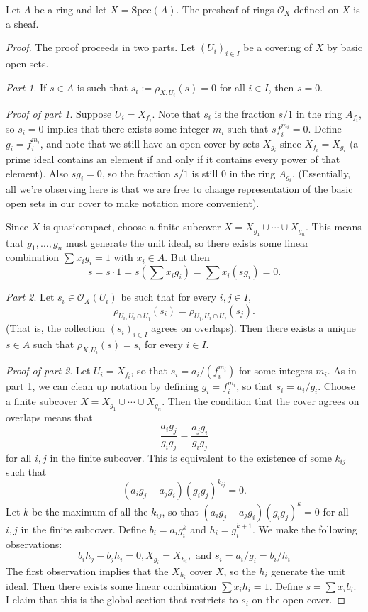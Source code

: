 \begin{proposition}
Let $ A$ be a ring and let $ X = \mathrm{Spec}(A)$. The presheaf
of rings $ \mathcal{O}_X$ defined on $ X$ is a sheaf.
\end{proposition}

\begin{proof}
The proof proceeds in two parts. Let $ (U_i)_{i \in I}$ be a
covering of $ X$ by basic open sets.

\emph{Part 1}. If $ s \in A$ is such that $ s_i := \rho_{X,
U_i}(s) = 0$ for all $ i \in I$, then $ s = 0$.

\emph{Proof of part 1}. Suppose $ U_i = X_{f_i}$. Note that $
s_i$ is the fraction $ s/1$ in the ring $ A_{f_i}$, so $ s_i =
0$ implies that there exists some integer $ m_i$ such that $
sf_i^{m_i} = 0$. Define $ g_i = f_i ^{m_i}$, and note that we
still have an open cover by sets $ X_{g_i}$ since $ X_{f_i} =
X_{g_i}$ (a prime ideal contains an element if and only if it
contains every power of that element). Also $ s g_i = 0$, so the
fraction $ s/1$ is still $ 0$ in the ring $ A_{g_i}$.
(Essentially, all we're observing here is that we are free to
change representation of the basic open sets in our cover to
make notation more convenient).

Since $ X$ is quasicompact, choose a finite subcover $ X =
X_{g_1} \cup \dotsb \cup X_{g_n}$. This means that $ g_1,
\dotsc, g_n$ must generate the unit ideal, so there exists some
linear combination $ \sum x_i g_i = 1$ with $ x_i \in A$. But
then
\[ s = s \cdot 1 = s \left( \sum x_i g_i \right) = \sum x_i (s
g_i) = 0.\]

\emph{Part 2}. Let $ s_i \in \mathcal{O}_X(U_i)$ be such that
for every $ i, j \in I$,
\[ \rho_{U_i, U_i \cap U_j}(s_i) = \rho_{U_j, U_i \cap
U_j}(s_j).\]
(That is, the collection $ (s_i)_{i \in I}$ agrees on overlaps).
Then there exists a unique $ s \in A$ such that $ \rho_{X,
U_i}(s) = s_i$ for every $ i \in I$.

\emph{Proof of part 2}. Let $ U_i = X_{f_i}$, so that $ s_i =
a_i/(f_i^{m_i})$ for some integers $ m_i$. As in part 1, we can
clean up notation by defining $ g_i = f_i^{m_i}$, so that $ s_i
= a_i/g_i$. Choose a finite subcover $ X = X_{g_1} \cup \dotsb
\cup X_{g_n}$. Then the condition that the cover agrees on
overlaps means that
\[ \frac{a_i g_j}{g_i g_j} = \frac{a_j g_i}{g_i g_j} \]
for all $ i, j$ in the finite subcover. This is equivalent to
the existence of some $ k_{ij}$ such that
\[ (a_i g_j - a_j g_i) (g_i g_j)^{k_{ij}} = 0.\]
Let $ k$ be the maximum of all the $ k_{ij}$, so that $ (a_i g_j
- a_j g_i)(g_i g_j)^k = 0$ for all $ i, j$ in the finite
subcover. Define $ b_i = a_i g_i^k$ and $ h_i = g_i^{k+1}$. We
make the following observations:
\[ b_i h_j - b_j h_i = 0, X_{g_i} = X_{h_i}, \text{ and } s_i =
a_i/g_i = b_i/h_i \]
The first observation implies that the $ X_{h_i}$ cover $ X$, so
the $ h_i$ generate the unit ideal. Then there exists some
linear combination $ \sum x_i h_i = 1$. Define $ s = \sum x_i
b_i$. I claim that this is the global section that restricts to
$ s_i$ on the open cover.


\end{proof}
